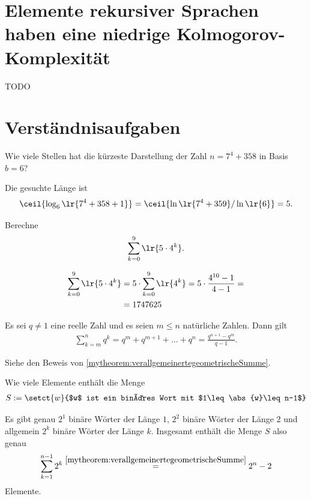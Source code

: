 \section{Elemente rekursiver Sprachen haben eine niedrige Kolmogorov-Komplexität}
TODO

\clearpage
\section{Verständnisaufgaben}

\begin{myexercise}
	Wie viele Stellen hat die kürzeste Darstellung der Zahl $n = 7^4 + 358$ in Basis $b = 6$?
	\begin{myanswer}
		Die gesuchte Länge ist
		\begin{align*}
			\ceil{\log_6\lr{7^4 + 358 + 1}} = \ceil{\ln\lr{7^4 + 359} / \ln\lr{6}} = 5.
		\end{align*}
	\end{myanswer}
\end{myexercise}

\begin{myexercise}
	Berechne
	\begin{align*}
		\sum_{k=0}^9 \lr{5 \cdot 4^k}.
	\end{align*}

	\begin{myanswer}
		\begin{align*}
			\sum_{k=0}^9 \lr{5 \cdot 4^k} &= 5\cdot \sum_{k=0}^9 \lr{4^k} = 5\cdot \frac{4^{10} - 1}{4 - 1} =\\
			&= 1747625
		\end{align*}
	\end{myanswer}
\end{myexercise}

\begin{myexercise}
		Es sei $q \neq 1$ eine reelle Zahl und es seien $m\leq n$ natürliche Zahlen. Dann gilt
	\begin{align*}
		\sum_{k = m}^n q^k = q^m + q^{m+1} + \ldots + q^n = \frac{q^{n+1}-q^m}{q-1}.
	\end{align*}
	\begin{myanswer}
		Siehe den Beweis von \cref{mytheorem:verallgemeinertegeometrischeSumme}.
	\end{myanswer}
\end{myexercise}

\begin{myexercise}
		Wie viele Elemente enthält die Menge
	\begin{align*}
		S := \setct{w}{$w$ ist ein binäres Wort mit $1\leq\abs{w}\leq n-1$}
	\end{align*}
	\begin{myanswer}
		Es gibt genau $2^1$ binäre Wörter der Länge $1$, $2^2$ binäre Wörter der Länge $2$ und allgemein $2^k$ binäre Wörter der Länge $k$. Insgesamt enthält die Menge $S$ also genau
		\begin{align*}
			\sum_{k = 1}^{n-1} 2^k \stackrel{\cref{mytheorem:verallgemeinertegeometrischeSumme}}{=} 2^n - 2
		\end{align*}
		Elemente.
	\end{myanswer}
\end{myexercise}
